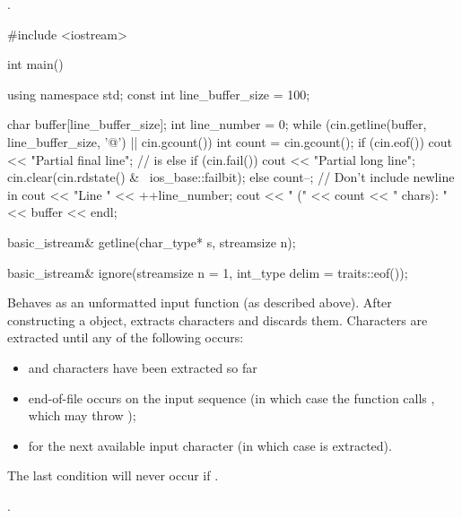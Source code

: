\begin{itemdescr}
\pnum
\returns
{}.

\pnum
\begin{example}
\begin{codeblock}
#include <iostream>

int main() {
  using namespace std;
  const int line_buffer_size = 100;

  char buffer[line_buffer_size];
  int line_number = 0;
  while (cin.getline(buffer, line_buffer_size, '@\textbackslash@n') || cin.gcount()) {
    int count = cin.gcount();
    if (cin.eof())
      cout << "Partial final line";     //  is 
    else if (cin.fail()) {
      cout << "Partial long line";
      cin.clear(cin.rdstate() & ~ios_base::failbit);
    } else {
      count--;                          // Don't include newline in 
      cout << "Line " << ++line_number;
    }
    cout << " (" << count << " chars): " << buffer << endl;
  }
}
\end{codeblock}
\end{example}
\end{itemdescr}

%
\begin{itemdecl}
basic_istream& getline(char_type* s, streamsize n);
\end{itemdecl}

\begin{itemdescr}
\pnum
\returns
{}
\end{itemdescr}

%
\begin{itemdecl}
basic_istream& ignore(streamsize n = 1, int_type delim = traits::eof());
\end{itemdecl}

\begin{itemdescr}
\pnum
\effects
Behaves as an unformatted input function
(as described above).
After constructing a  object, extracts
characters and discards them.
Characters are extracted until any of the following occurs:
\begin{itemize}
\item
{}
and
 characters have been extracted so far
\item
end-of-file occurs on the input sequence
(in which case the function calls
,
which may throw
);
\item
{}
for the next available input character 
(in which case  is extracted).
\end{itemize}
\begin{note}
The last condition will never occur if
.
\end{note}

\pnum
\returns
{}.
\end{itemdescr}

